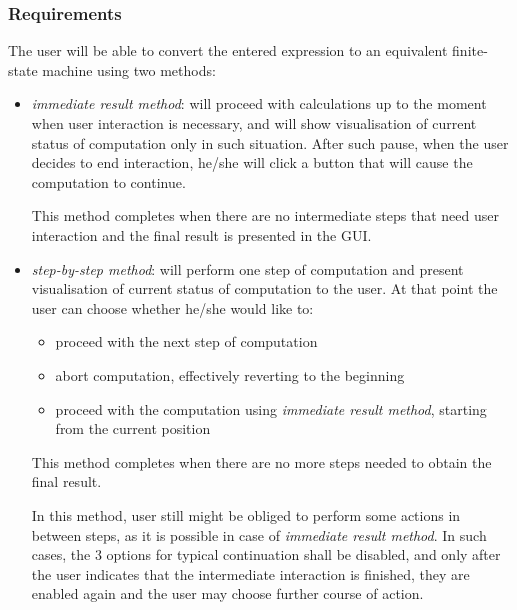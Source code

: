 \documentclass{article}
\begin{document}
\subsubsection*{Requirements}
The user will be able to convert the entered expression to an equivalent finite-state machine using
two methods:
\begin{itemize}

  \item \textit{immediate result method}: will proceed with calculations up to the moment when user
  interaction is necessary, and will show visualisation of current status of computation only in
  such situation. After such pause, when the user decides to end interaction, he/she will click a
  button that will cause the computation to continue.
  
  This method completes when there are no intermediate steps that need user interaction and the
  final result is presented in the GUI.

  \item \textit{step-by-step method}: will perform one step of computation and present visualisation
  of current status of computation to the user. At that point the user can choose whether he/she
  would like to:
  
  \begin{itemize}

    \item proceed with the next step of computation

    \item abort computation, effectively reverting to the beginning

    \item proceed with the computation using \textit{immediate result method}, starting from the
    current position

  \end{itemize}
  
  This method completes when there are no more steps needed to obtain the final result.
  
  In this method, user still might be obliged to perform some actions in between steps, as it is
  possible in case of \textit{immediate result method}. In such cases, the 3 options for typical
  continuation shall be disabled, and only after the user indicates that the intermediate
  interaction is finished, they are enabled again and the user may choose further course of action.

\end{itemize}
\end{document}
